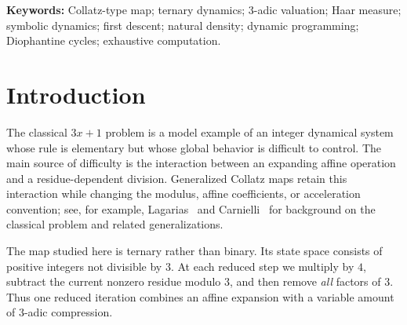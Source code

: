 \documentclass[11pt]{article}
\theoremstyle{definition}
\theoremstyle{remark}
\begin{document}
\begin{abstract}
Finally, the archived exhaustive computation through $10^{11}$ contains exactly
$66,666,666,667$ admissible starts.  All are classified into the three known positive terminal cycles, with zero reported unknown cycles and zero arithmetic overflows.  The basin counts are
$6,602,925,203$ for $\{1\}$,
$43,211,124,603$ for $\{2\}$, and
$16,852,616,861$ for the four-cycle.
Moreover, every admissible $n$ with
$50<n\le10^{11}$ has a strict first descent.  The largest observed first-descent time is $355$, attained at
$n=76,089,719,024$.
The complete $10^{11}$ archive was independently re-aggregated and structurally audited; a hardened V5.2 scanner was freshly rerun on validation ranges and on a $100$-million-integer production interval containing the $355$-step record.  The full $10^{11}$ domain was not freshly recomputed from zero with V5.2 during that audit.

The global conjecture that every positive admissible integer eventually enters one of the three known positive terminal cycles remains open.
\end{abstract}

\noindent\textbf{Keywords:}
Collatz-type map; ternary dynamics; $3$-adic valuation; Haar measure;
symbolic dynamics; first descent; natural density; dynamic programming;
Diophantine cycles; exhaustive computation.

\tableofcontents

\section{Introduction}

The classical $3x+1$ problem is a model example of an integer dynamical system whose rule is elementary but whose global behavior is difficult to control.  The main source of difficulty is the interaction between an expanding affine operation and a residue-dependent division.  Generalized Collatz maps retain this interaction while changing the modulus, affine coefficients, or acceleration convention; see, for example, Lagarias~\cite{lagarias1985} and Carnielli~\cite{carnielli2015} for background on the classical problem and related generalizations.

The map studied here is ternary rather than binary.  Its state space consists of positive integers not divisible by $3$.  At each reduced step we multiply by $4$, subtract the current nonzero residue modulo $3$, and then remove \emph{all} factors of $3$.  Thus one reduced iteration combines an affine expansion with a variable amount of $3$-adic compression.
\end{document}
